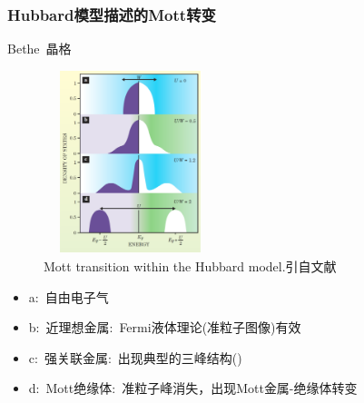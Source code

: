 \frame
{
	\frametitle{\textrm{Hubbard}模型描述的\textrm{Mott}转变}
\begin{minipage}[b]{0.42\linewidth}
	\hspace{45pt} \textrm{Bethe}~晶格
\begin{figure}[h!]
\centering
\vspace{-5pt}
\includegraphics[height=2.1in,width=2.00in,viewport=0 0 800 950,clip]{Figures/Hubbard_U-W.png}
\caption{\textrm{\tiny Mott transition within the Hubbard model.引自文献\cite{PT57-53_2004}}}%
\label{Mott_Hubbard}
\end{figure}
\end{minipage}
\hfill
\begin{minipage}[t]{0.56\linewidth}
	\vspace*{-2.58in}
	\begin{itemize}
		\setlength{\itemsep}{14pt}
		\item \textrm{a}:~自由电子气
		\item \textrm{b}:~近理想金属:~\textrm{Fermi}液体理论(准粒子图像)有效
		\item \textrm{c}:~强关联金属:~出现典型的三峰结构({\fontsize{7.2pt}{5.2pt}})
		\item \textrm{d}:~\textrm{Mott}绝缘体:~准粒子峰消失，出现\textrm{Mott}金属-绝缘体转变
	\end{itemize}
\end{minipage}
}

